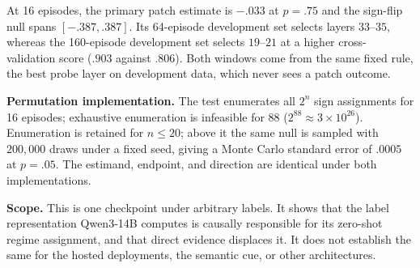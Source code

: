 At 16 episodes, the primary patch estimate is $-.033$ at $p=.75$ and the sign-flip
null spans $[-.387,.387]$. Its 64-episode development set selects layers
$33$--$35$, whereas the 160-episode development set selects $19$--$21$ at a
higher cross-validation score ($.903$ against $.806$). Both windows come from the
same fixed rule, the best probe layer on development data, which never sees a
patch outcome.

\noindent\textbf{Permutation implementation.} The test enumerates all $2^{n}$ sign
assignments for 16 episodes; exhaustive enumeration is infeasible for 88
($2^{88}\approx3\times10^{26}$). Enumeration is retained for $n\le20$; above it
the same null is sampled with $200{,}000$ draws under a fixed seed, giving a
Monte Carlo standard error of $.0005$ at $p=.05$. The estimand, endpoint, and
direction are identical under both implementations.

\noindent\textbf{Scope.} This is one checkpoint under arbitrary labels. It shows that
the label representation Qwen3-14B computes is causally responsible for its
zero-shot regime assignment, and that direct evidence displaces it. It does not
establish the same for the hosted deployments, the semantic cue, or other
architectures.

